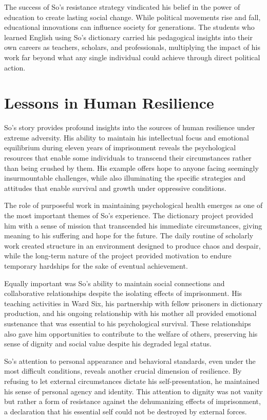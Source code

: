 \documentclass[
  Letterpaper,
]{scrbook}
\begin{document}
The success of So's resistance strategy vindicated his belief in the
power of education to create lasting social change. While political
movements rise and fall, educational innovations can influence society
for generations. The students who learned English using So's dictionary
carried his pedagogical insights into their own careers as teachers,
scholars, and professionals, multiplying the impact of his work far
beyond what any single individual could achieve through direct political
action.

\section{Lessons in Human Resilience}\label{lessons-in-human-resilience}

So's story provides profound insights into the sources of human
resilience under extreme adversity. His ability to maintain his
intellectual focus and emotional equilibrium during eleven years of
imprisonment reveals the psychological resources that enable some
individuals to transcend their circumstances rather than being crushed
by them. His example offers hope to anyone facing seemingly
insurmountable challenges, while also illuminating the specific
strategies and attitudes that enable survival and growth under
oppressive conditions.

The role of purposeful work in maintaining psychological health emerges
as one of the most important themes of So's experience. The dictionary
project provided him with a sense of mission that transcended his
immediate circumstances, giving meaning to his suffering and hope for
the future. The daily routine of scholarly work created structure in an
environment designed to produce chaos and despair, while the long-term
nature of the project provided motivation to endure temporary hardships
for the sake of eventual achievement.

Equally important was So's ability to maintain social connections and
collaborative relationships despite the isolating effects of
imprisonment. His teaching activities in Ward Six, his partnership with
fellow prisoners in dictionary production, and his ongoing relationship
with his mother all provided emotional sustenance that was essential to
his psychological survival. These relationships also gave him
opportunities to contribute to the welfare of others, preserving his
sense of dignity and social value despite his degraded legal status.

So's attention to personal appearance and behavioral standards, even
under the most difficult conditions, reveals another crucial dimension
of resilience. By refusing to let external circumstances dictate his
self-presentation, he maintained his sense of personal agency and
identity. This attention to dignity was not vanity but rather a form of
resistance against the dehumanizing effects of imprisonment, a
declaration that his essential self could not be destroyed by external
forces.
\end{document}
